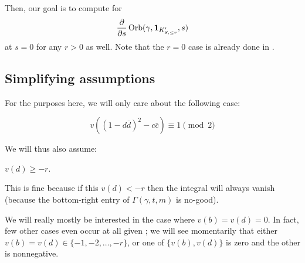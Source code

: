 Then, our goal is to compute for
\begin{equation}
  \pdv{}{s}\operatorname{Orb}(\gamma, \mathbf{1}_{K'_{S, \le r}}, s)
  \label{eq:orbital_goal}
\end{equation}
at $s=0$ for any $r > 0$ as well.
Note that the $r = 0$ case is already done in \cite{ref:AFL}.

\subsection{Simplifying assumptions}
For the purposes here, we will only care about the following case:
\begin{assume}
  \[ v\left( (1-d\bar d)^2 - c \bar c\right) \equiv 1 \pmod 2 \]
  \label{assume:u_odd}
\end{assume}

We will thus also assume:
\begin{assume}
  $v(d) \geq -r$.
\end{assume}
This is fine because if this $v(d) < -r$ then the integral will always vanish
(because the bottom-right entry of $\Gamma(\gamma, t, m)$ is no-good).

We will really mostly be interested in the case where $v(b) = v(d) = 0$.
In fact, few other cases even occur at all
given ;
we will see momentarily that either
$v(b) = v(d) \in \{-1, -2, \dots, -r\}$,
or one of $\{v(b), v(d)\}$ is zero and the other is nonnegative.


